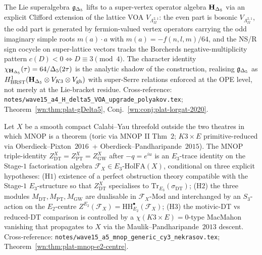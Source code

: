 \begin{conjecture}\ClaimStatusConjectured
\label{wn:conj:plat-w15-H-delta5-VOA}
The Lie superalgebra $\mathfrak{g}_{\Delta_5}$ lifts to a super-vertex operator
algebra $\mathbf{H}_{\Delta_5}$ via an explicit Clifford extension of the
lattice VOA $V_{\Lambda^{2,1}_{II}}$: the even part is bosonic
$V_{\Lambda^{2,1}_{II}}$, the odd part is generated by fermion-valued
vertex operators carrying the odd imaginary simple roots
$m(a) \cdot a$ with $m(a) = -f(n, l, m)/64$, and the NS/R sign
cocycle on super-lattice vectors tracks the Borcherds
negative-multiplicity pattern
$c(D) < 0 \iff D \equiv 3 \pmod 4$. The character identity
$\chi_{\mathbf{H}_{\Delta_5}}(\tau) = 64/\Delta_5(2\tau)$ is the analytic
shadow of the construction, realising $\mathfrak{g}_{\Delta_5}$ as
$H^1_{\mathrm{BRST}}(\mathbf{H}_{\Delta_5} \otimes V_{K3} \otimes V_{\mathrm{gh}})$
with super-Serre relations enforced at the OPE level, not merely at
the Lie-bracket residue.
Cross-reference: \texttt{notes/wave15\_a4\_H\_delta5\_VOA\_upgrade\_polyakov.tex};
Theorem~\ref{wn:thm:plat-gDelta5}, Conj.~\ref{wn:conj:plat-lorgat-2020}.
\end{conjecture}

\begin{conjecture}\ClaimStatusConjectured
\label{wn:conj:plat-w15-mnop-generic}
Let $X$ be a smooth compact Calabi--Yau threefold outside the two
theatres in which MNOP is a theorem (toric via MNOP II Thm~$2$;
$K3 \times E$ primitive-reduced via Oberdieck--Pixton~$2016$~+
Oberdieck--Pandharipande~$2015$). The MNOP triple-identity
$Z^X_{\mathrm{DT}} = Z^X_{\mathrm{PT}} = Z^X_{\mathrm{GW}}$ after
$-q = e^{iu}$ is an $E_3$-trace identity on the Stage-$1$
factorisation algebra $\mathcal{F}_X \in E_3\text{-}\mathrm{HolFA}(X)$,
conditional on three explicit hypotheses:
\textup{(H$1$)} existence of a perfect obstruction theory compatible
with the Stage-$1$ $E_3$-structure so that $Z^X_{\mathrm{DT}}$
specialises to $\mathrm{Tr}_{E_3}(\sigma_{\mathrm{DT}})$;
\textup{(H$2$)} the three modules $M_{\mathrm{DT}}, M_{\mathrm{PT}},
M_{\mathrm{GW}}$ are dualisable in $\mathcal{F}_X\text{-}\mathrm{Mod}$
and interchanged by an $S_3$-action on the $E_2$-centre
$Z^{E_2}(\mathcal{F}_X) = \mathrm{HH}^\bullet_{E_2}(\mathcal{F}_X)$;
\textup{(H$3$)} the motivic-DT vs reduced-DT comparison is controlled
by a $\chi(K3 \times E) = 0$-type MacMahon vanishing that propagates
to $X$ via the Maulik--Pandharipande~$2013$ descent.
Cross-reference: \texttt{notes/wave15\_a5\_mnop\_generic\_cy3\_nekrasov.tex};
Theorem~\ref{wn:thm:plat-mnop-e2-centre}.
\end{conjecture}


